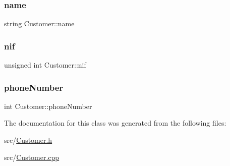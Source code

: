 \hypertarget{classCustomer_a42c1c948fa0121c82b2725826d9f8300}{}\label{classCustomer_a42c1c948fa0121c82b2725826d9f8300} 
\subsubsection{\texorpdfstring{name}{name}}
{\footnotesize\ttfamily string Customer\+::name\hspace{0.3cm}{\ttfamily [private]}}

\hypertarget{classCustomer_a65ad3329532d5ad31e36f4ac81858e31}{}\label{classCustomer_a65ad3329532d5ad31e36f4ac81858e31} 
\subsubsection{\texorpdfstring{nif}{nif}}
{\footnotesize\ttfamily unsigned int Customer\+::nif\hspace{0.3cm}{\ttfamily [private]}}

\hypertarget{classCustomer_ad8c8d99b4c35f66a1a87b234c6078e0f}{}\label{classCustomer_ad8c8d99b4c35f66a1a87b234c6078e0f} 
\subsubsection{\texorpdfstring{phone\+Number}{phoneNumber}}
{\footnotesize\ttfamily int Customer\+::phone\+Number\hspace{0.3cm}{\ttfamily [private]}}



The documentation for this class was generated from the following files\+:\begin{DoxyCompactItemize}
\item 
src/\hyperlink{Customer_8h}{Customer.\+h}\item 
src/\hyperlink{Customer_8cpp}{Customer.\+cpp}\end{DoxyCompactItemize}
